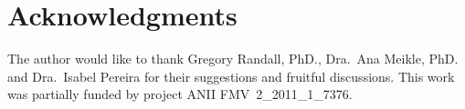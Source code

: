\documentclass{article}
\begin{document}
\section{Acknowledgments}
The author would like to thank Gregory Randall, PhD., Dra.~Ana Meikle,
PhD. and Dra.~Isabel Pereira for their suggestions and fruitful
discussions. This work was partially funded by project ANII
FMV~2\_2011\_1\_7376.




\balance
\end{document}
